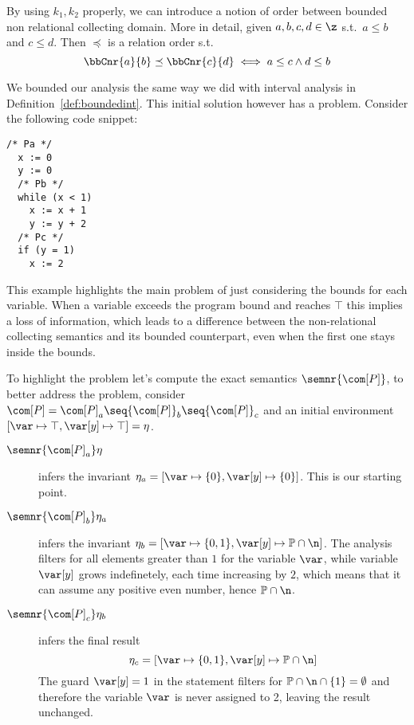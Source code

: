 By using \(k_1, k_2\) properly, we can introduce a notion of order
between bounded non relational collecting domain. More in detail,
given \(a,b,c,d \in \z\) s.t.\ \(a\leq b\) and \(c \leq d\). Then
\(\preceq\) is a relation order s.t.
\begin{equation*}
  \bbCnr{a}{b} \preceq \bbCnr{c}{d} \iff a \leq c \land d \leq b
\end{equation*}

We bounded our analysis the same way we did with interval analysis in
Definition~\ref{def:boundedint}. This initial solution however has a
problem. Consider the following code snippet:
\begin{lstlisting}[language=Imp,caption=Snippet where bounded analysis diverges from the unbounded counterpart, label=code3]
  /* Pa */ 
  x := 0
  y := 0
  /* Pb */ 
  while (x < 1)
    x := x + 1
    y := y + 2
  /* Pc */ 
  if (y = 1)
    x := 2
\end{lstlisting}

This example highlights the main problem of just considering the
bounds for each variable. When a variable exceeds the program bound
and reaches \(\top\) this implies a loss of information, which leads
to a difference between the non-relational collecting semantics and
its bounded counterpart, even when the first one stays inside the
bounds.

To highlight the problem let's compute the exact semantics
\(\semnr{\com[P]}\), to better address the problem, consider
\(\com[P] = {\com[P]}_a\seq {\com[P]}_b \seq {\com[P]}_c\) and an
initial environment \([\var\mapsto\top,\var[y]\mapsto\top] = \eta\).
\begin{description}
\item[\(\semnr{{\com[P]}_a}\eta\)] infers the invariant
  \(\eta_a = [\var\mapsto \{0\}, \var[y]\mapsto\{0\}]\). This is our
  starting point.
\item[\(\semnr{{\com[P]}_b}\eta_a\)] infers the invariant
  \(\eta_b = [\var\mapsto\{0,1\},
  \var[y]\mapsto\mathbb{P}\cap\n]\). The analysis filters for all
  elements greater than \(1\) for the variable \(\var\), while
  variable \(\var[y]\) grows indefinetely, each time increasing by
  \(2\), which means that it can assume any positive even number,
  hence \(\mathbb{P} \cap \n\).
\item[\(\semnr{{\com[P]}_c}\eta_b\)] infers the final result
  \begin{equation*}
    \eta_c = [\var\mapsto\{0,1\}, \var[y]\mapsto\mathbb{P}\cap\n]
  \end{equation*}
  The guard \(\var[y] = 1\) in the  statement filters for
  \(\mathbb{P}\cap\n\cap\{1\} = \emptyset\) and therefore the variable
  \(\var\) is never assigned to 2, leaving the result unchanged.
\end{description}

